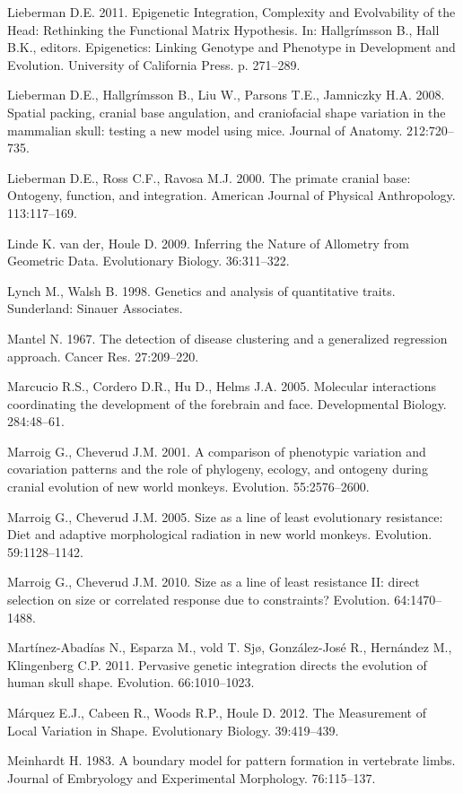 \documentclass[12pt,]{article}
\begin{document}
Lieberman D.E. 2011. Epigenetic Integration, Complexity and Evolvability
of the Head: Rethinking the Functional Matrix Hypothesis. In:
Hallgrímsson B., Hall B.K., editors. Epigenetics: Linking Genotype and
Phenotype in Development and Evolution. University of California Press.
p. 271--289.

Lieberman D.E., Hallgrímsson B., Liu W., Parsons T.E., Jamniczky H.A.
2008. Spatial packing, cranial base angulation, and craniofacial shape
variation in the mammalian skull: testing a new model using mice.
Journal of Anatomy. 212:720--735.

Lieberman D.E., Ross C.F., Ravosa M.J. 2000. The primate cranial base:
Ontogeny, function, and integration. American Journal of Physical
Anthropology. 113:117--169.

Linde K. van der, Houle D. 2009. Inferring the Nature of Allometry from
Geometric Data. Evolutionary Biology. 36:311--322.

Lynch M., Walsh B. 1998. Genetics and analysis of quantitative traits.
Sunderland: Sinauer Associates.

Mantel N. 1967. The detection of disease clustering and a generalized
regression approach. Cancer Res. 27:209--220.

Marcucio R.S., Cordero D.R., Hu D., Helms J.A. 2005. Molecular
interactions coordinating the development of the forebrain and face.
Developmental Biology. 284:48--61.

Marroig G., Cheverud J.M. 2001. A comparison of phenotypic variation and
covariation patterns and the role of phylogeny, ecology, and ontogeny
during cranial evolution of new world monkeys. Evolution. 55:2576--2600.

Marroig G., Cheverud J.M. 2005. Size as a line of least evolutionary
resistance: Diet and adaptive morphological radiation in new world
monkeys. Evolution. 59:1128--1142.

Marroig G., Cheverud J.M. 2010. Size as a line of least resistance II:
direct selection on size or correlated response due to constraints?
Evolution. 64:1470--1488.

Martínez-Abadías N., Esparza M., vold T. Sjø, González-José R.,
Hernández M., Klingenberg C.P. 2011. Pervasive genetic integration
directs the evolution of human skull shape. Evolution. 66:1010--1023.

Márquez E.J., Cabeen R., Woods R.P., Houle D. 2012. The Measurement of
Local Variation in Shape. Evolutionary Biology. 39:419--439.

Meinhardt H. 1983. A boundary model for pattern formation in vertebrate
limbs. Journal of Embryology and Experimental Morphology. 76:115--137.
\end{document}
